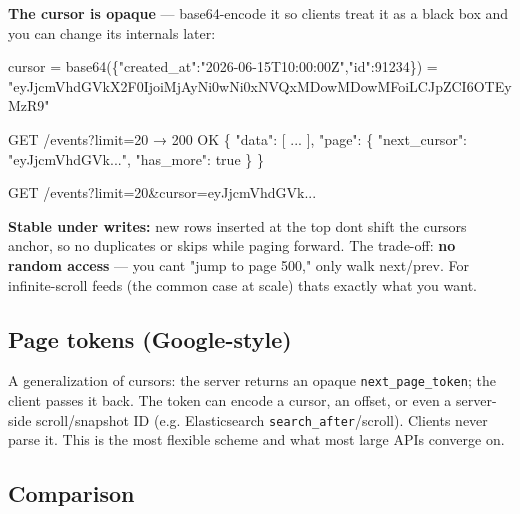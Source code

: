 \documentclass[11pt]{article}
\newenvironment{Shaded}{\begin{snugshade}}{\end{snugshade}}
\newcommand{\DecValTok}[1]{\textcolor[rgb]{0.96,0.45,0.00}{#1}}
\newcommand{\NormalTok}[1]{\textcolor[rgb]{0.81,0.81,0.76}{#1}}
\newcommand{\OperatorTok}[1]{\textcolor[rgb]{0.81,0.81,0.76}{#1}}
\newcommand{\StringTok}[1]{\textcolor[rgb]{0.96,0.31,0.31}{#1}}
\begin{document}
\textbf{The cursor is opaque} --- base64-encode it so clients treat it as a black box and you can change its internals later:


\begin{Shaded}
\begin{Highlighting}[]
\NormalTok{cursor }\OperatorTok{=}\NormalTok{ base64(\{}\StringTok{"created\_at"}\NormalTok{:}\StringTok{"2026{-}06{-}15T10:00:00Z"}\NormalTok{,}\StringTok{"id"}\NormalTok{:}\DecValTok{91234}\NormalTok{\})}
       \OperatorTok{=} \StringTok{"eyJjcmVhdGVkX2F0IjoiMjAyNi0wNi0xNVQxMDowMDowMFoiLCJpZCI6OTEyMzR9"}
\end{Highlighting}
\end{Shaded}


\begin{Shaded}
\begin{Highlighting}[]
\NormalTok{GET /events?limit=20}
\NormalTok{→ 200 OK}
\NormalTok{\{}
\NormalTok{  "data": [ ... ],}
\NormalTok{  "page": \{}
\NormalTok{    "next\_cursor": "eyJjcmVhdGVk...",}
\NormalTok{    "has\_more": true}
\NormalTok{  \}}
\NormalTok{\}}

\NormalTok{GET /events?limit=20\&cursor=eyJjcmVhdGVk...}
\end{Highlighting}
\end{Shaded}

\textbf{Stable under writes:} new rows inserted at the top don\textquotesingle t shift the cursor\textquotesingle s anchor, so no duplicates or skips while paging forward. The trade-off: \textbf{no random access} --- you can\textquotesingle t "jump to page 500," only walk next/prev. For infinite-scroll feeds (the common case at scale) that\textquotesingle s exactly what you want.

\subsection{Page tokens (Google-style)}\label{page-tokens-google-style}

A generalization of cursors: the server returns an opaque \texttt{next\_page\_token}; the client passes it back. The token can encode a cursor, an offset, or even a server-side scroll/snapshot ID (e.g. Elasticsearch \texttt{search\_after}/scroll). Clients never parse it. This is the most flexible scheme and what most large APIs converge on.

\subsection{Comparison}\label{comparison}
\end{document}
